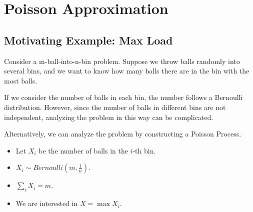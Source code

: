 \section{Poisson Approximation}
    \subsection{Motivating Example: Max Load}\label{subs:m-balls-in-n-bins}
        Consider a m-ball-into-n-bin problem. Suppose we throw balls randomly into several bins, and we want to know how many balls there are in the bin with the most balls.

        If we consider the number of balls in each bin, the number follows a Bernoulli distribution. However, since the number of balls in different bins are not independent, analyzing the problem in this way can be complicated.

        Alternatively, we can analyze the problem by constructing a Poisson Process.

        \begin{itemize}
            \item Let $X_i$ be the number of balls in the $i$-th bin.
            \item $X_i \sim Bernoulli(m, \frac{1}{n})$.
            \item $\sum_i X_i = m$.
            \item We are interested in $X = \max X_i$.
        \end{itemize}

